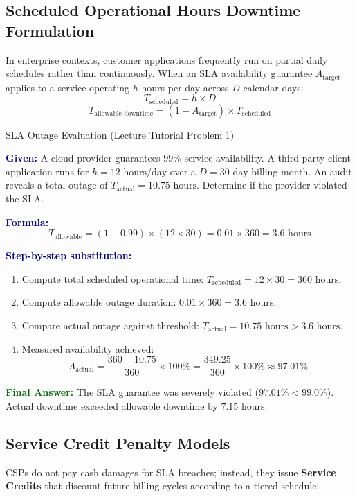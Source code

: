 \documentclass[11pt,a4paper,openany]{report}
\newcommand{\Given}{\par\textbf{\textcolor{navy}{Given:}} }
\newcommand{\Formula}{\par\textbf{\textcolor{navy}{Formula:}} }
\newcommand{\Steps}{\par\textbf{\textcolor{navy}{Step-by-step substitution:}}\par}
\newcommand{\Answer}{\par\textbf{\textcolor{darkgreen}{Final Answer:}} }
\begin{document}
\subsection{Scheduled Operational Hours Downtime Formulation}
In enterprise contexts, customer applications frequently run on partial daily schedules rather than continuously. When an SLA availability guarantee $A_{\text{target}}$ applies to a service operating $h$ hours per day across $D$ calendar days:
\begin{equation}
T_{\text{scheduled}} = h \times D
\end{equation}
\begin{equation}
T_{\text{allowable downtime}} = (1 - A_{\text{target}}) \times T_{\text{scheduled}}
\end{equation}

\begin{solved}{SLA Outage Evaluation (Lecture Tutorial Problem 1)}
\Given A cloud provider guarantees $99\%$ service availability. A third-party client application runs for $h = 12\text{ hours/day}$ over a $D = 30\text{-day}$ billing month. An audit reveals a total outage of $T_{\text{actual}} = 10.75\text{ hours}$. Determine if the provider violated the SLA.
\Formula
\begin{equation}
T_{\text{allowable}} = (1 - 0.99) \times (12 \times 30) = 0.01 \times 360 = 3.6\text{ hours}
\end{equation}
\Steps
\begin{enumerate}[leftmargin=*]
  \item Compute total scheduled operational time: $T_{\text{scheduled}} = 12 \times 30 = 360\text{ hours}$.
  \item Compute allowable outage duration: $0.01 \times 360 = 3.6\text{ hours}$.
  \item Compare actual outage against threshold: $T_{\text{actual}} = 10.75\text{ hours} > 3.6\text{ hours}$.
  \item Measured availability achieved:
  \begin{equation}
  A_{\text{actual}} = \frac{360 - 10.75}{360} \times 100\% = \frac{349.25}{360} \times 100\% \approx 97.01\%
  \end{equation}
\end{enumerate}
\Answer The SLA guarantee was severely violated ($97.01\% < 99.0\%$). Actual downtime exceeded allowable downtime by $7.15\text{ hours}$.
\end{solved}

\subsection{Service Credit Penalty Models}
CSPs do not pay cash damages for SLA breaches; instead, they issue \textbf{Service Credits} that discount future billing cycles according to a tiered schedule:
\end{document}
